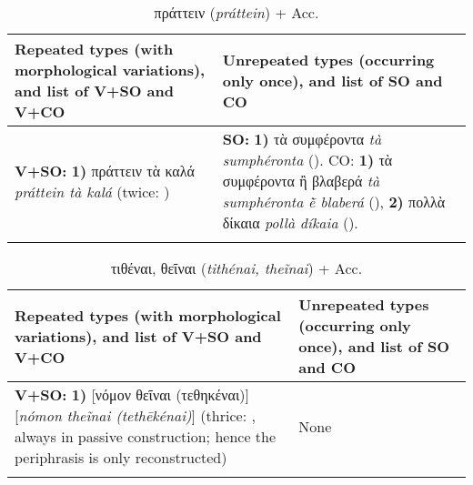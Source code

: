 \documentclass[output=paper,colorlinks,citecolor=brown]{langscibook}
\begin{document}
\begin{table}
\footnotesize
\begin{tabularx}{\textwidth}{QQ}
        \lsptoprule
        Repeated types (with morphological variations), and list of V+SO and V+CO & Unrepeated types (occurring only once), and list of SO and CO     \\
        \midrule
        \textbf{V+SO:} \newline
        \textbf{1)} πράττειν τὰ καλά \textit{práttein tà kalá} (twice: )
        &
        \textbf{SO:} \newline
        \textbf{1)} τὰ συμφέροντα \textit{tà sumphéronta} ().  CO:
        \textbf{1)} τὰ συμφέροντα ἢ βλαβερά \textit{tà sumphéronta ḕ blaberá} (),
        \textbf{2)} πολλὰ δίκαια \textit{pollà díkaia} ().\\
        \lspbottomrule
\end{tabularx}
\caption{{πράττειν (\textit{práttein})} + Acc.}
\end{table}
%
%
\begin{table}
\footnotesize
\begin{tabularx}{\textwidth}{QQ}
        \lsptoprule
        Repeated types (with morphological variations), and list of V+SO and V+CO & Unrepeated types (occurring only once), and list of SO and CO     \\
        \midrule
        \textbf{V+SO:} \newline
        \textbf{1)} [νόμον θεῖναι (τεθηκέναι)] [\textit{nómon theĩnai (tethēkénai)}] (thrice: , always in passive construction; hence the periphrasis is only reconstructed)&None\\
        \lspbottomrule
\end{tabularx}
\caption{{τιθέναι, θεῖναι (\textit{tithénai, theĩnai})} + Acc.}
\end{table}
\end{document}
